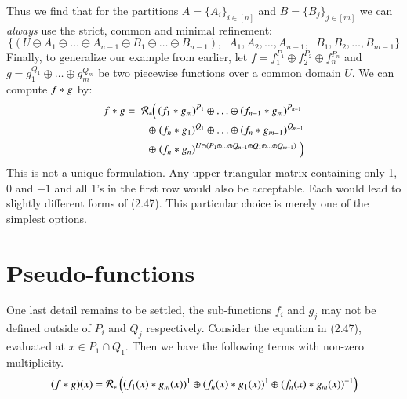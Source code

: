 Thus we find that for the partitions $A = \{ A_i \}_{i \in [n]}$ and $B = \{ B_j \}_{j \in [m]}$ we can \emph{always}
use the strict, common and minimal refinement:
\begin{equation*}
	\Big\{ (U \ominus A_1 \ominus \ldots \ominus A_{n-1} \ominus B_1 \ominus \ldots \ominus B_{n-1}), \;\;
	A_1, A_2, \ldots, A_{n-1}, \;\; B_1, B_2, \ldots, B_{m-1}
	\Big\}
\end{equation*}
Finally, to generalize our example from earlier, let $f = f_1^{P_1} \oplus f_2^{P_2} \oplus f_n^{P_n}$
and  $g = g_1^{Q_1} \oplus \ldots \oplus g_m^{Q_m}$ be two piecewise functions over a common domain $U$.
We can compute $f * g$ by:
\begin{align*}
f * g = \; \mathcal{R}_*  \; & \!\!\! \left( \,
		(f_1 * g_m)^{P_1} 
		\oplus \ldots \oplus 
		 (f_{n-1} * g_m)^{P_{n-1}} \right. \notag \\
	\oplus & \;
		 (f_n * g_1)^{Q_1} 
		\oplus \ldots \oplus 
		 (f_n * g_{m-1})^{Q_{m-1}} \notag \\
	\oplus & \left. 
		 (f_n * g_n)^{U \ominus (P_1 \oplus \ldots \oplus Q_{n-1} \oplus Q_1 \oplus \ldots \oplus Q_{m-1})}
	\; \right)
\end{align*}
This is not a unique formulation.
Any upper triangular matrix containing only 1, 0 and $-1$ and all 1's in the first row would also be acceptable.
Each would lead to slightly different forms of (2.47). This particular choice is merely one of the simplest options. 






%
%
\section{Pseudo-functions}

One last detail remains to be settled, the sub-functions $f_i$ and $g_j$ may not be defined outside of 
$P_i$ and $Q_j$ respectively.
Consider the equation in (2.47), evaluated at $x \in P_1 \cap Q_1$.
Then we have the following terms with non-zero multiplicity.
\begin{equation}
	(f * g)(x) = \mathcal{R}_* 
		\left(   (f_1(x) * g_m(x))^1 \oplus 
				(f_n(x) * g_1(x))^1 \oplus 
				(f_n(x) * g_m(x))^{-1} 
		\right)
\end{equation}


